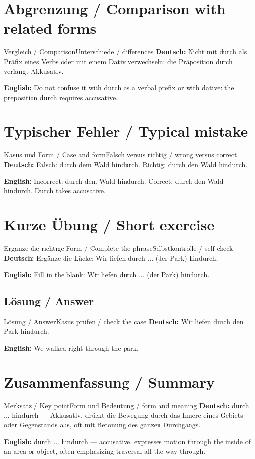 \documentclass[a4paper,11pt]{article}
\newcommand{\GermanText}[1]{\textbf{Deutsch: }#1\par}
\newcommand{\EnglishText}[1]{{\small\color{SoftGray}\textbf{English: }#1\par}}
\begin{document}
\section{Abgrenzung / Comparison with related forms}
\begin{grammarentry}{Vergleich / Comparison}{Unterschiede / differences}
\GermanText{Nicht mit durch als Präfix eines Verbs oder mit einem Dativ verwechseln: die Präposition durch verlangt Akkusativ.}
\EnglishText{Do not confuse it with durch as a verbal prefix or with dative: the preposition durch requires accusative.}
\end{grammarentry}
\section{Typischer Fehler / Typical mistake}
\begin{grammarentry}{Kasus und Form / Case and form}{Falsch versus richtig / wrong versus correct}
\GermanText{Falsch: durch dem Wald hindurch. Richtig: durch den Wald hindurch.}
\EnglishText{Incorrect: durch dem Wald hindurch. Correct: durch den Wald hindurch. Durch takes accusative.}
\end{grammarentry}
\section{Kurze Übung / Short exercise}
\begin{grammarentry}{Ergänze die richtige Form / Complete the phrase}{Selbstkontrolle / self-check}
\GermanText{Ergänze die Lücke: Wir liefen durch ... (der Park) hindurch.}
\EnglishText{Fill in the blank: Wir liefen durch ... (der Park) hindurch.}
\end{grammarentry}
\subsection{Lösung / Answer}
\begin{grammarentry}{Lösung / Answer}{Kasus prüfen / check the case}
\GermanText{Wir liefen durch den Park hindurch.}
\EnglishText{We walked right through the park.}
\end{grammarentry}
\section{Zusammenfassung / Summary}
\begin{grammarentry}{Merksatz / Key point}{Form und Bedeutung / form and meaning}
\GermanText{durch ... hindurch — Akkusativ. drückt die Bewegung durch das Innere eines Gebiets oder Gegenstands aus, oft mit Betonung des ganzen Durchgangs.}
\EnglishText{durch ... hindurch — accusative. expresses motion through the inside of an area or object, often emphasizing traversal all the way through.}
\end{grammarentry}
\end{document}
